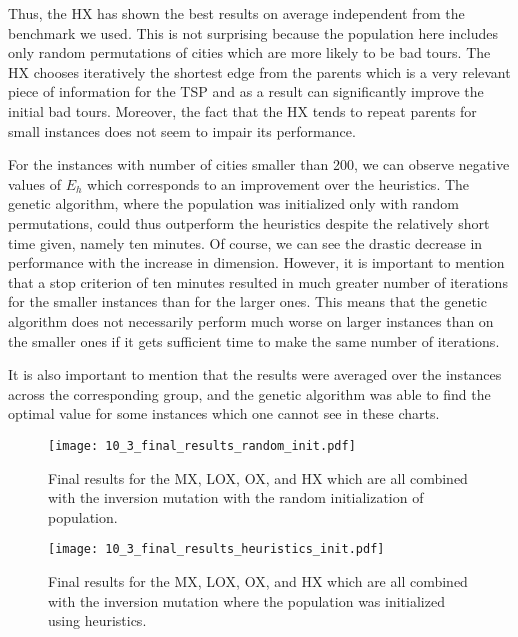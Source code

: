 Thus, the HX has shown the best results on average independent from the benchmark we used. This is not surprising because the population here includes only random permutations of cities which are more likely to be bad tours. The HX chooses iteratively the shortest edge from the parents which is a very relevant piece of information for the TSP and as a result can significantly improve the initial bad tours. Moreover, the fact that the HX tends to repeat parents for small instances does not seem to impair its performance.\par 

For the instances with number of cities smaller than 200, we can observe negative values of $E_{h}$ which corresponds to an improvement over the heuristics. The genetic algorithm, where the population was initialized only with random permutations, could thus outperform the heuristics despite the relatively short time given, namely ten minutes. Of course, we can see the drastic decrease in performance with the increase in dimension. However, it is important to mention that a stop criterion of ten minutes resulted in much greater number of iterations for the smaller instances than for the larger ones. This means that the genetic algorithm does not necessarily perform much worse on larger instances than on the smaller ones if it gets sufficient time to make the same number of iterations.  \par

It is also important to mention  that the results were averaged over the instances across the corresponding group, and the genetic algorithm was able to find the optimal value for some instances which one cannot see in these charts. \par  

\begin{sidewaysfigure}[htp] \centering
	\texttt{[image: 10\_3\_final\_results\_random\_init.pdf]}
	\caption{Final results for the MX, LOX, OX, and HX which are all combined with the inversion mutation with the random initialization of population.}
	\label{10_3_final_results_random_init}
\end{sidewaysfigure}

\vspace{2cm}
	
\begin{sidewaysfigure}[htp] \centering
	\texttt{[image: 10\_3\_final\_results\_heuristics\_init.pdf]}
	\caption{Final results for the MX, LOX, OX, and HX which are all combined with the inversion mutation where the population was initialized using heuristics.}
	\label{10_3_final_results_heuristics_init}
\end{sidewaysfigure}

